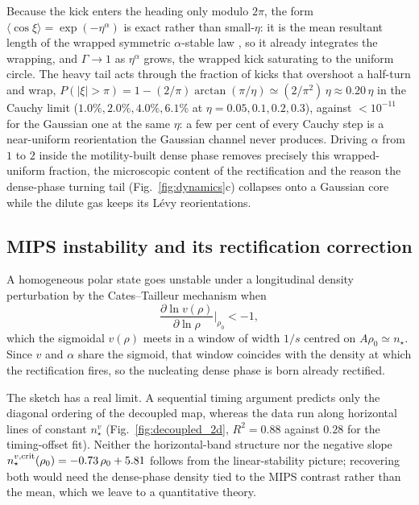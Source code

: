 \documentclass[11pt,a4paper]{article}
\begin{document}
Because the kick enters the heading only modulo $2\pi$, the form
$\langle\cos\xi\rangle = \exp(-\eta^\alpha)$
is exact rather than small-$\eta$: it is the mean resultant length
of the wrapped symmetric $\alpha$-stable law
\citep{Gatto2003, Pewsey2008, Mardia2000}, so it already
integrates the wrapping, and $\Gamma \to 1$ as $\eta^\alpha$ grows, the
wrapped kick saturating to the uniform circle. The heavy
tail acts through the fraction of kicks that overshoot a half-turn
and wrap, $P(|\xi| > \pi) = 1 - (2/\pi)\arctan(\pi/\eta) \simeq
(2/\pi^2)\,\eta \approx 0.20\,\eta$ in the Cauchy limit
($1.0\%, 2.0\%, 4.0\%, 6.1\%$ at $\eta = 0.05, 0.1, 0.2, 0.3$),
against $< 10^{-11}$ for the Gaussian one at the same $\eta$: a few
per cent of every Cauchy step is a near-uniform reorientation the
Gaussian channel never produces. Driving $\alpha$ from $1$ to
$2$ inside the motility-built dense phase removes precisely this
wrapped-uniform fraction, the microscopic content of the
rectification and the reason the dense-phase turning tail
(Fig.~\ref{fig:dynamics}c) collapses onto a Gaussian core while the
dilute gas keeps its L\'evy reorientations.

\subsection{MIPS instability and its rectification correction}

A homogeneous polar state goes unstable under a longitudinal
density perturbation by the Cates--Tailleur mechanism
\citep{CatesTailleur2015} when
\begin{equation}
\frac{\partial \ln v(\rho)}{\partial \ln \rho}\bigg|_{\rho_0}
   < -1,
\label{eq:CT_criterion}
\end{equation}
which the sigmoidal $v(\rho)$ meets in a window of width $1/s$
centred on $A\rho_0 \simeq n_\star$. Since $v$ and $\alpha$
share the sigmoid, that window coincides with the density at
which the rectification fires, so the nucleating dense phase is
born already rectified.

The sketch has a real limit. A sequential timing argument
predicts only the diagonal ordering of the decoupled map,
whereas the data run along horizontal lines of constant
$n_\star^v$ (Fig.~\ref{fig:decoupled_2d}, $R^2 = 0.88$ against
$0.28$ for the timing-offset fit). Neither the horizontal-band
structure nor the negative slope $n_\star^{v,{\rm
crit}}(\rho_0) = -0.73\,\rho_0 + 5.81$ follows from the
linear-stability picture; recovering both would need the
dense-phase density tied to the MIPS contrast rather than the
mean, which we leave to a quantitative theory.
\end{document}
